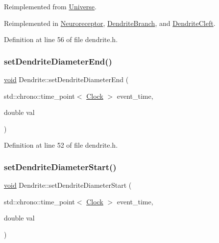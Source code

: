 Reimplemented from \mbox{\hyperlink{class_universe_aa22202ae740eb1355529afcb13285e91}{Universe}}.



Reimplemented in \mbox{\hyperlink{class_neuroreceptor_a0660a316ef44cf723509f720acd16f24}{Neuroreceptor}}, \mbox{\hyperlink{class_dendrite_branch_a2ce03fbad4a70564eeaafb62debd4d74}{Dendrite\+Branch}}, and \mbox{\hyperlink{class_dendrite_cleft_a428b8e5117f381a382e0071b936d42a1}{Dendrite\+Cleft}}.



Definition at line 56 of file dendrite.\+h.

\mbox{\label{class_dendrite_ada331daa4464ae007b3f77612aa46937}} 
\subsubsection{\texorpdfstring{set\+Dendrite\+Diameter\+End()}{setDendriteDiameterEnd()}}
{\footnotesize\ttfamily \mbox{\hyperlink{glad_8h_a950fc91edb4504f62f1c577bf4727c29}{void}} Dendrite\+::set\+Dendrite\+Diameter\+End (\begin{DoxyParamCaption}\item[{std\+::chrono\+::time\+\_\+point$<$ \mbox{\hyperlink{universe_8h_a0ef8d951d1ca5ab3cfaf7ab4c7a6fd80}{Clock}} $>$}]{event\+\_\+time,  }\item[{double}]{val }\end{DoxyParamCaption})\hspace{0.3cm}{\ttfamily [inline]}}



Definition at line 52 of file dendrite.\+h.

\mbox{\label{class_dendrite_af33658a5420b56cfd321d75ae5784302}} 
\subsubsection{\texorpdfstring{set\+Dendrite\+Diameter\+Start()}{setDendriteDiameterStart()}}
{\footnotesize\ttfamily \mbox{\hyperlink{glad_8h_a950fc91edb4504f62f1c577bf4727c29}{void}} Dendrite\+::set\+Dendrite\+Diameter\+Start (\begin{DoxyParamCaption}\item[{std\+::chrono\+::time\+\_\+point$<$ \mbox{\hyperlink{universe_8h_a0ef8d951d1ca5ab3cfaf7ab4c7a6fd80}{Clock}} $>$}]{event\+\_\+time,  }\item[{double}]{val }\end{DoxyParamCaption})\hspace{0.3cm}{\ttfamily [inline]}}



